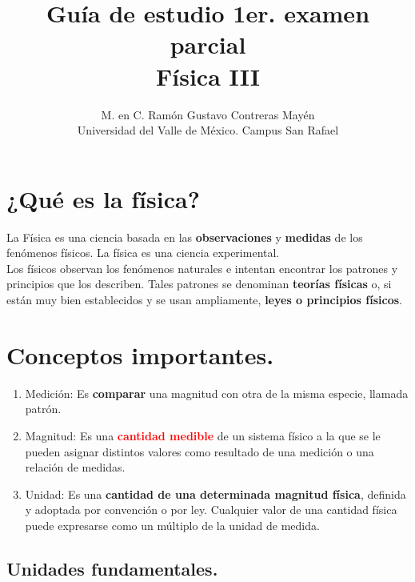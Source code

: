 \documentclass[14pt]{extarticle}
\title{\vspace*{-2cm} Guía de estudio 1er. examen parcial\\  Física III}
\author{M. en C. Ramón Gustavo Contreras Mayén \\ {\fontsize{14}{14}\selectfont Universidad del Valle de México. Campus San Rafael}}
\date{}
\newcommand{\textocolor}[2]{\textbf{\textcolor{#1}{#2}}}
\begin{document}
\maketitle

\section*{¿Qué es la física?}

La Física es una ciencia basada en las \textocolor{cobalt}{observaciones} y \textocolor{cadmiumgreen}{medidas} de los fenómenos físicos. La física es una ciencia experimental.
\\
Los físicos observan los fenómenos naturales e intentan encontrar los patrones y principios que los describen. Tales patrones se denominan \textocolor{byzantine}{teorías físicas}  o, si están muy bien establecidos y se usan ampliamente, \textocolor{cordovan}{leyes o principios físicos}.


\section{Conceptos importantes.}

\begin{enumerate}
\item Medición: Es \textocolor{lava}{comparar} una magnitud con otra de la misma especie, llamada patrón.
\item Magnitud: Es una \textocolor{red}{cantidad medible} de un sistema físico a la que se le pueden asignar distintos valores como resultado de una medición o una relación de medidas.
\item Unidad: Es una \textocolor{bole}{cantidad de una determinada magnitud física}, definida y adoptada por convención o por ley. Cualquier valor de una cantidad física puede expresarse como un múltiplo de la unidad de medida.
\end{enumerate}

\subsection{Unidades fundamentales.}
\end{document}
